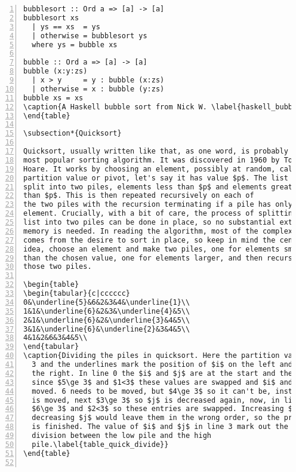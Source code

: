 \documentclass[11pt,a4paper]{scrartcl}
\begin{document}
\begin{table}
\begin{lstlisting}[numbers=left]
bubblesort :: Ord a => [a] -> [a]
bubblesort xs
  | ys == xs  = ys
  | otherwise = bubblesort ys
  where ys = bubble xs

bubble :: Ord a => [a] -> [a]
bubble (x:y:zs)
  | x > y     = y : bubble (x:zs)
  | otherwise = x : bubble (y:zs)
bubble xs = xs
\caption{A Haskell bubble sort from Nick W. \label{haskell_bubble}}
\end{table}

\subsection*{Quicksort}

Quicksort, usually written like that, as one word, is probably the
most popular sorting algorithm. It was discovered in 1960 by Tony
Hoare. It works by choosing an element, possibly at random, called the
partition value or pivot, let's say it has value $p$. The list is then
split into two piles, elements less than $p$ and elements greater
than $p$. This is then repeated recursively on each of
the two piles with the recursion terminating if a pile has only one
element. Crucially, with a bit of care, the process of splitting the
list into two piles can be done in place, so no substantial extra
memory is needed. In reading the algorithm, most of the complexity
comes from the desire to sort in place, so keep in mind the central
idea, choose an element and make two piles, one for elements smaller
than the chosen value, one for elements larger, and then recurse onto
those two piles.

\begin{table}
\begin{tabular}{c|cccccc}
0&\underline{5}&6&2&3&4&\underline{1}\\
1&1&\underline{6}&2&3&\underline{4}&5\\
2&1&\underline{6}&2&\underline{3}&4&5\\
3&1&\underline{6}&\underline{2}&3&4&5\\
4&1&2&6&3&4&5\\
\end{tabular}
\caption{Dividing the piles in quicksort. Here the partition value is
  3 and the underlines mark the position of $i$ on the left and $j$ on
  the right. In line 0 the $i$ and $j$ are at the start and the end,
  since $5\ge 3$ and $1<3$ these values are swapped and $i$ and $j$
  moved. 6 needs to be moved, but $4\ge 3$ so it can't be, instead $j$
  is moved, next $3\ge 3$ so $j$ is decreased again, now, in line 3,
  $6\ge 3$ and $2<3$ so these entries are swapped. Increasing $i$ and
  decreasing $j$ would leave them in the wrong order, so the procedure
  is finished. The value of $i$ and $j$ in line 3 mark out the
  division between the low pile and the high
  pile.\label{table_quick_divide}}
\end{table}


\end{lstlisting}
\end{table}
\end{document}
